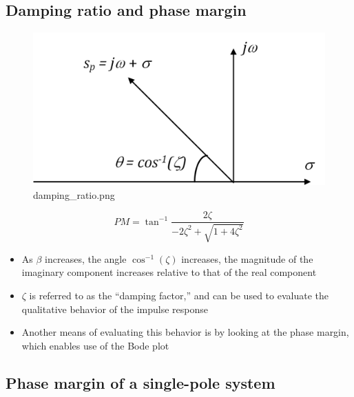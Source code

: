 \documentclass[11pt]{article}
\begin{document}
    \hypertarget{damping-ratio-and-phase-margin}{%
\subsection{Damping ratio and phase
margin}\label{damping-ratio-and-phase-margin}}

    \begin{figure}
\centering
\includegraphics{damping_ratio.png}
\caption{damping\_ratio.png}
\end{figure}

    \begin{equation}
PM = \tan^{-1}\dfrac{2\zeta}{-2\zeta^2 + \sqrt{1+4\zeta^2}}
\end{equation}

    \begin{itemize}
\item
  As \(\beta\) increases, the angle \(\cos^{-1}(\zeta)\) increases, the
  magnitude of the imaginary component increases relative to that of the
  real component
\item
  \(\zeta\) is referred to as the ``damping factor,'' and can be used to
  evaluate the qualitative behavior of the impulse response
\item
  Another means of evaluating this behavior is by looking at the phase
  margin, which enables use of the Bode plot
\end{itemize}

    \hypertarget{phase-margin-of-a-single-pole-system}{%
\subsection{Phase margin of a single-pole
system}\label{phase-margin-of-a-single-pole-system}}
\end{document}
